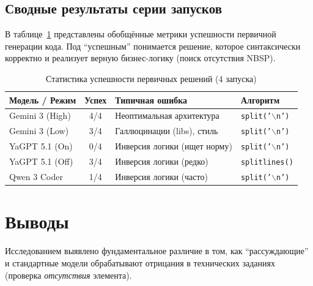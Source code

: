 \subsection{Сводные результаты серии запусков}

В таблице~\ref{tab:stability_test} представлены обобщённые метрики успешности первичной генерации кода. Под ``успешным'' понимается решение, которое синтаксически корректно и реализует верную бизнес-логику (поиск отсутствия NBSP).

\begin{table}[H]
\centering
\caption{Статистика успешности первичных решений (4 запуска)}
\label{tab:stability_test}
\begin{tabular}{|l|c|p{4cm}|l|}
\hline
\textbf{Модель / Режим} & \textbf{Успех} & \textbf{Типичная ошибка} & \textbf{Алгоритм} \\ \hline
Gemini 3 (High) & 4/4 & Неоптимальная архитектура & \texttt{split('$\backslash$n')} \\ \hline
Gemini 3 (Low) & 3/4 & Галлюцинации (libs), стиль & \texttt{split('$\backslash$n')} \\ \hline
YaGPT 5.1 (On) & 0/4 & Инверсия логики (ищет норму) & \texttt{split('$\backslash$n')} \\ \hline
YaGPT 5.1 (Off) & 3/4 & Инверсия логики (редко) & \texttt{splitlines()} \\ \hline
Qwen 3 Coder & 1/4 & Инверсия логики (часто) & \texttt{split('$\backslash$n')} \\ \hline
\end{tabular}
\end{table}

\section*{Выводы}

Исследованием выявлено фундаментальное различие в том, как ``рассуждающие'' и стандартные модели обрабатывают отрицания в технических заданиях (проверка \textit{отсутствия} элемента).

